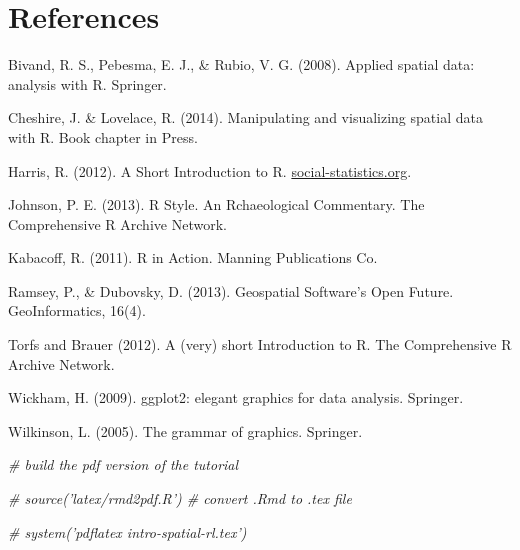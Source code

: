 \documentclass[]{article}
\newenvironment{Shaded}{}{}
\newcommand{\CommentTok}[1]{\textcolor[rgb]{0.38,0.63,0.69}{\textit{{#1}}}}
\begin{document}
\newpage \section{References}\label{references}

Bivand, R. S., Pebesma, E. J., \& Rubio, V. G. (2008). Applied spatial
data: analysis with R. Springer.

Cheshire, J. \& Lovelace, R. (2014). Manipulating and visualizing
spatial data with R. Book chapter in Press.

Harris, R. (2012). A Short Introduction to R.
\href{http://www.social-statistics.org/}{social-statistics.org}.

Johnson, P. E. (2013). R Style. An Rchaeological Commentary. The
Comprehensive R Archive Network.

Kabacoff, R. (2011). R in Action. Manning Publications Co.

Ramsey, P., \& Dubovsky, D. (2013). Geospatial Software's Open Future.
GeoInformatics, 16(4).

Torfs and Brauer (2012). A (very) short Introduction to R. The
Comprehensive R Archive Network.

Wickham, H. (2009). ggplot2: elegant graphics for data analysis.
Springer.

Wilkinson, L. (2005). The grammar of graphics. Springer.

\begin{Shaded}
\begin{Highlighting}[]
\CommentTok{# build the pdf version of the tutorial}

\CommentTok{# source('latex/rmd2pdf.R') # convert .Rmd to .tex file}

\CommentTok{# system('pdflatex intro-spatial-rl.tex')}
\end{Highlighting}
\end{Shaded}
\end{document}
